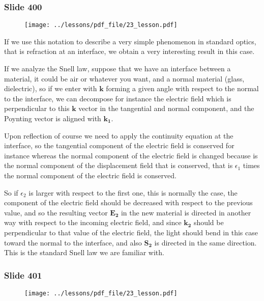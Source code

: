 \documentclass[../main/main.tex]{subfiles}
\begin{document}
\newpage

\subsubsection{Slide 400}

\begin{figure}[h!]
\centering
\texttt{[image: ../lessons/pdf\_file/23\_lesson.pdf]}
\end{figure}

If we use this notation to describe a very simple phenomenon in standard optics, that is refraction at an interface, we obtain a very interesting result in this case. 

If we analyze the Snell law, suppose that we have an interface between a material, it could be air or whatever you want, and a normal material (glass, dielectric), so if we enter with $\mathbf{k}$ forming a given angle with respect to the normal to the interface, we can decompose for instance the electric field which is perpendicular to this $\mathbf{k}$ vector in the tangential and normal component, and the Poynting vector is aligned with $\mathbf{k_1}$.

Upon reflection of course we need to apply the continuity equation at the interface, so the tangential component of the electric field is conserved for instance whereas the normal component of the electric field is changed because is the  normal component of the displacement field that is conserved, that is $\epsilon_1$ times the normal component of the electric field is conserved. 

So if $\epsilon_2$ is larger with respect to the first one, this is normally the case, the component of the electric field should be decreased with respect to the previous value, and so the resulting vector $\mathbf{E_2}$ in the new material is directed in another way with respect to the incoming electric field, and since $\mathbf{k_2}$ should be perpendicular to that value of the electric field, the light should bend in this case toward the normal to the interface, and also $\mathbf{S_2}$ is directed in the same direction. This is the standard Snell law we are familiar with.

\newpage

\subsubsection{Slide 401}

\begin{figure}[h!]
\centering
\texttt{[image: ../lessons/pdf\_file/23\_lesson.pdf]}
\end{figure}
\end{document}
